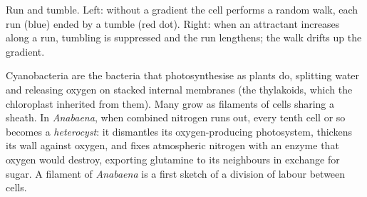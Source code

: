 \begin{omfigure}

{\small Run and tumble. Left: without a gradient the cell performs a
random walk, each run (blue) ended by a tumble (red dot). Right: when
an attractant increases along a run, tumbling is suppressed and the
run lengthens; the walk drifts up the gradient.}
\end{omfigure}

\begin{example}\label{ex:b2:unicellular-diversity:cyanobacteria}
Cyanobacteria are the bacteria that photosynthesise as plants do,
splitting water and releasing oxygen on stacked internal membranes
(the thylakoids, which the chloroplast inherited from them). Many
grow as filaments of cells sharing a sheath. In \emph{Anabaena},
when combined nitrogen runs out, every tenth cell or so becomes a
\emph{heterocyst}: it dismantles its oxygen-producing photosystem,
thickens its wall against oxygen, and fixes atmospheric nitrogen with
an enzyme that oxygen would destroy, exporting glutamine to its
neighbours in exchange for sugar. A filament of \emph{Anabaena} is a
first sketch of a division of labour between cells.
\end{example}

